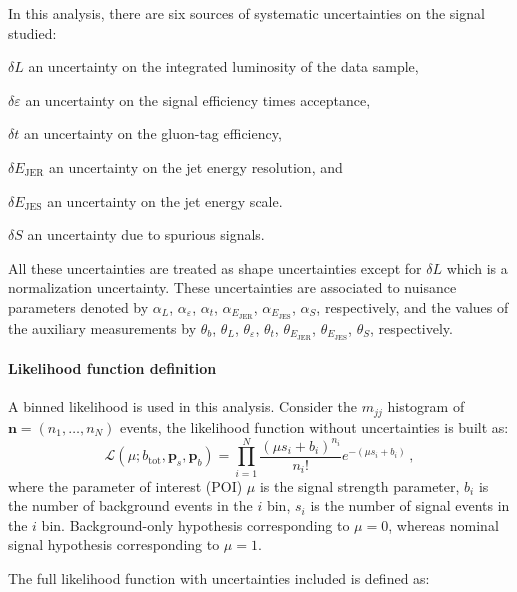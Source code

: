 In this analysis, there are six sources of systematic uncertainties on the signal studied: 

\begin{description}
\item $\delta L$ an uncertainty on the integrated luminosity of the data
  sample,
\item $\delta\varepsilon$ an uncertainty on the signal efficiency times
  acceptance, 
\item $\delta t$ an uncertainty on the gluon-tag efficiency,
\item $\delta E_\mathrm{JER}$ an uncertainty on the jet energy
  resolution, and
\item $\delta E_\mathrm{JES}$ an uncertainty on the jet energy scale.
\item $\delta S$ an uncertainty due to spurious signals.
\end{description}

\noindent
All these uncertainties are treated as shape uncertainties except for
$\delta L$ which is a normalization uncertainty.
These uncertainties are associated to nuisance parameters denoted by
$\alpha_L$,
$\alpha_\varepsilon$, $\alpha_t$, $\alpha_{E_\mathrm{JER}}$,
$\alpha_{E_\mathrm{JES}}$, $\alpha_S$, 
respectively, and the values of the auxiliary measurements by 
$\theta_b$, $\theta_L$, $\theta_\varepsilon$, $\theta_t$,
$\theta_{E_\mathrm{JER}}$, $\theta_{E_\mathrm{JES}}$, $\theta_S$, respectively.


\paragraph{Likelihood function definition}\mbox{}\par

A binned likelihood is used in this analysis. Consider the $m_{jj}$ histogram of $\bm{n} = (n_1, \ldots, n_N)$
events, the likelihood function without uncertainties is built as:
\begin{equation}
\mathcal{L}(\mu;b_\mathrm{tot},\bm{p}_s,\bm{p}_b) = \prod_{i=1}^N \frac{(\mu s_i +
b_i)^{n_i}}{n_i!} e^{-(\mu s_i + b_i)}\, ,
\end{equation}
\noindent
where the parameter of interest (POI) $\mu$ is the signal strength
parameter, $b_i$ is the number of background events in the $i$ bin, $s_i$ is the number of signal events in the $i$ bin. Background-only
hypothesis corresponding to $\mu = 0$, whereas nominal signal hypothesis corresponding to $\mu = 1$.

The full likelihood function with uncertainties included is defined as:

